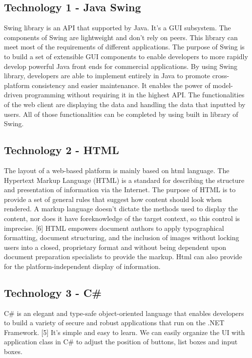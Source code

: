 \documentclass[10pt,onecolumn,journal,draftclsnofoot]{IEEEtran}
\begin{document}
	\subsection{Technology 1 - Java Swing}
	\par
	Swing library is an API that supported by Java. It’s a GUI subsystem. The components of Swing are lightweight and don’t rely on peers. This library can meet most of the requirements of different applications. The purpose of Swing is to build a set of extensible GUI components to enable developers to more rapidly develop powerful Java front ends for commercial applications. By using Swing library, developers are able to implement entirely in Java to promote cross-platform consistency and easier maintenance. It enables the power of model-driven programming without requiring it in the highest API. The functionalities of the web client are displaying the data and handling the data that inputted by users. All of those functionalities can be completed by using built in library of Swing.  
    \subsection{Technology 2 - HTML}
	\par 
	The layout of a web-based platform is mainly based on html language. The Hypertext Markup Language (HTML) is a standard for describing the structure and presentation of information via the Internet. The purpose of HTML is to provide a set of general rules that suggest how content should look when rendered. A markup language doesn't dictate the methods used to display the content, nor does it have foreknowledge of the target context, so this control is imprecise. [6] HTML empowers document authors to apply typographical formatting, document structuring, and the inclusion of images without locking users into a closed, proprietary format and without being dependent upon document preparation specialists to provide the markup. Html can also provide for the platform-independent display of information. 
	\subsection{Technology 3 - C\#}
    \par 
    C\# is an elegant and type-safe object-oriented language that enables developers to build a variety of secure and robust applications that run on the .NET Framework. [5] It’s simple and easy to learn. We can easily organize the UI with application class in C\# to adjust the position of buttons, list boxes and input boxes.
\end{document}
